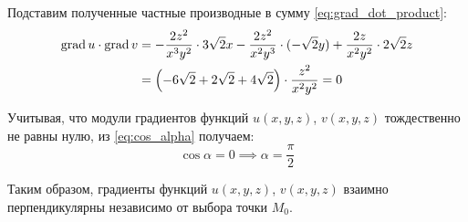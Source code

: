 \begin{solution}
  Подставим полученные частные производные в сумму \eqref{eq:grad_dot_product}:
  \[
  \begin{aligned}
  \textrm{grad}\, u\cdot\textrm{grad}\, v &= -\dfrac{2z^2}{x^3y^2}\cdot 3\sqrt{2}x
                        -\dfrac{2z^2}{x^2y^3}\cdot(-\sqrt{2}y)
                        +\dfrac{2z}{x^2y^2}\cdot 2\sqrt{2}z \\
                      &= \left(-6\sqrt{2}+2\sqrt{2}+4\sqrt{2}\right)\cdot\dfrac{z^2}{x^2y^2} = 0
  \end{aligned}
  \]
  
  Учитывая, что модули градиентов функций \( u(x,y,z) \), \( v(x,y,z) \) тождественно не равны нулю, из \eqref{eq:cos_alpha} получаем:
  \[ \cos\alpha=0\implies\alpha=\dfrac{\pi}{2} \]
  
  Таким образом, градиенты функций \( u(x,y,z) \), \( v(x,y,z) \) взаимно перпендикулярны независимо от выбора точки \( M_0 \).
\end{solution}
